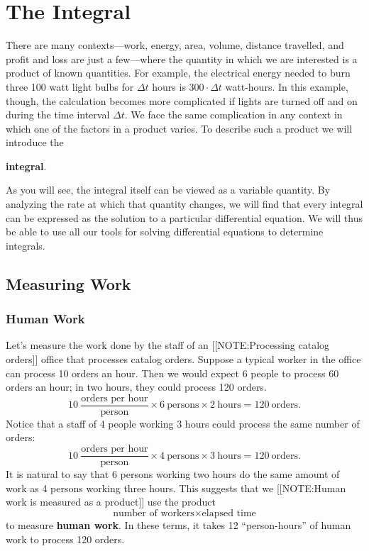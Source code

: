 
\chapter{The Integral}
\label{chap:the-integral}

There are many contexts---work, energy, area, volume, distance
travelled, and profit and loss are just a few---where the quantity in
which we are interested is a product of known quantities.  For
example, the electrical energy needed to burn three 100 watt light
bulbs for $\Delta t$ hours is $300 \cdot \Delta t$ watt-hours.  In
this example, though, the calculation becomes more complicated if
lights are turned off and on during the time interval $\Delta t$.  We
face the same complication in any context in which one of the factors
in a product varies.  To describe such a product we will introduce the

{\bf integral}.

As you will see, the integral itself can be viewed as a variable
quantity.  By analyzing the rate at which that quantity changes, we
will find that every integral can be expressed as the solution to a
particular differential equation.  We will thus be able to use all our
tools for solving differential equations to determine integrals.

\section{Measuring Work}
\label{sec:measuring-work}

\subsection{Human Work}
\label{subsec:human-work}

Let's measure the work done by the staff of an 
[[NOTE:Processing  catalog orders]]
office that processes catalog orders.  Suppose a typical worker in the
office can process 10 orders an hour.  Then we would expect 6 people
to process 60 orders an hour; in two hours, they could process 120
orders.
\[
10 \ \dfrac{\mbox{orders per hour}}{\mbox{person}}  
		\times 
		6 \ \mbox{persons} \times 2 \ \mbox{hours} =
		120 \ \mbox{orders}.
\]
Notice that a staff of 4 people working 3 hours could process the same 
number of orders:
\[
10 \ \dfrac{\mbox{orders per hour}}{\mbox{person}}  
		\times 
		4 \ \mbox{persons} \times 3 \ \mbox{hours} =
		120 \ \mbox{orders}.
\]
It is natural to say that 6 persons working two hours
do the same amount of work as 4 persons working three hours. This 
suggests that we 
[[NOTE:Human work is measured as a product]]
use the product
	\[
\mbox{number of workers} \times \mbox{elapsed time}
\]
to measure {\bf human work}.  In these terms, it takes 12 ``person-hours'' of human work to process 120 orders.  

